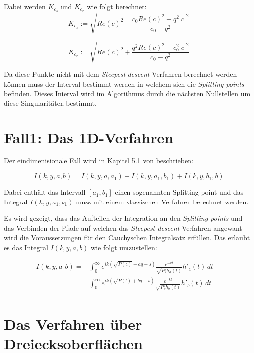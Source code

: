 Dabei werden $K_{c_s}$ und $K_{c_r}$ wie folgt berechnet:
\begin{equation}
    K_{c_s} := \sqrt{Re(c)^2 - \frac{c_0Re(c)^2-q^2|c|^2}{c_0-q^2}}
\end{equation}

\begin{equation}
    K_{c_r} := \sqrt{Re(c)^2 + \frac{q^2Re(c)^2-c_0^2|c|^2}{c_0-q^2}}
\end{equation}

Da diese Punkte nicht mit dem \textit{Steepest-descent}-Verfahren berechnet werden können muss der Interval bestimmt werden in welchem sich die \textit{Splitting-points} befinden.
Dieses Interval wird im Algorithmus durch die nächsten Nullstellen um diese Singularitäten bestimmt.

\section{Fall1: Das 1D-Verfahren}

Der eindimenisionale Fall wird in Kapitel 5.1 von \cite{gasperini:hal-03209144} beschrieben: 

\begin{equation}
    I(k,y,a,b) = I(k,y,a,a_1) + I(k,y,a_1, b_1) + I(k,y,b_1,b)
\end{equation}

Dabei enthält das Intervall $[a_1,b_1]$ einen sogenannten Splitting-point und das Integral $I(k,y,a_1,b_1)$ muss mit einem klassischen Verfahren berechnet werden.


Es wird gezeigt, dass das Aufteilen der Integration an den \textit{Splitting-points} und das Verbinden der Pfade auf welchen das \textit{Steepest-descent}-Verfahren angewant wird die Voraussetzungen für den Cauchyschen Integralsatz erfüllen.
Das erlaubt es das Integral $I(k,y,a,b)$ wie folgt umzustellen:

\begin{equation}
    \begin{aligned}
    I(k,y,a,b) =& \int_{0}^{\infty} e^{ik(\sqrt{P(a)} + aq +s)} \frac{e^{-kt}}{\sqrt{P(h_a(t)}} h'_a(t)\,dt -\\
    & \int_{0}^{\infty} e^{ik(\sqrt{P(b)} + bq +s)} \frac{e^{-kt}}{\sqrt{P(h_b(t)}} h'_b(t)\,dt \\
    \end{aligned}
\end{equation}

\section{Das Verfahren über Dreiecksoberflächen}


